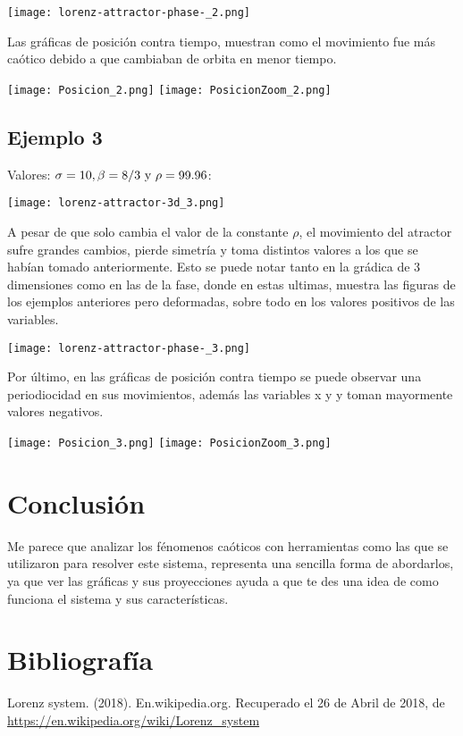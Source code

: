 \documentclass{article}
\begin{document}
\begin{center}
    \texttt{[image: lorenz-attractor-phase-\_2.png]}
\end{center}

Las gráficas de posición contra tiempo, muestran como el movimiento fue más caótico debido a que cambiaban de orbita en menor tiempo.
\begin{center}
    \texttt{[image: Posicion\_2.png]}
    \texttt{[image: PosicionZoom\_2.png]}
\end{center}

\subsection{Ejemplo 3}
Valores: $\sigma = 10, \beta = 8/3 \textup{ y } \rho = 99.96$:

\begin{center}
    \texttt{[image: lorenz-attractor-3d\_3.png]}
\end{center}
A pesar de que solo cambia el valor de la constante $\rho$, el movimiento del atractor sufre grandes cambios, pierde simetría y toma distintos valores a los que se habían tomado anteriormente. Esto se puede notar tanto en la grádica de 3 dimensiones como en las de la fase, donde en estas ultimas, muestra las figuras de los ejemplos anteriores pero deformadas, sobre todo en los valores positivos de las variables.
\begin{center}
    \texttt{[image: lorenz-attractor-phase-\_3.png]}
\end{center}
Por último, en las gráficas de posición contra tiempo se puede observar una periodiocidad en sus movimientos, además las variables x y y toman mayormente valores negativos.
\begin{center}
    \texttt{[image: Posicion\_3.png]}
    \texttt{[image: PosicionZoom\_3.png]}
\end{center}

\section{Conclusión}
Me parece que analizar los fénomenos caóticos con herramientas como las que se utilizaron para resolver este sistema, representa una sencilla forma de abordarlos, ya que ver las gráficas y sus proyecciones ayuda a que te des una idea de como funciona el sistema y sus características.

\section{Bibliografía}
Lorenz system. (2018). En.wikipedia.org. Recuperado el 26 de Abril de 2018, de \url{https://en.wikipedia.org/wiki/Lorenz_system}
\end{document}
